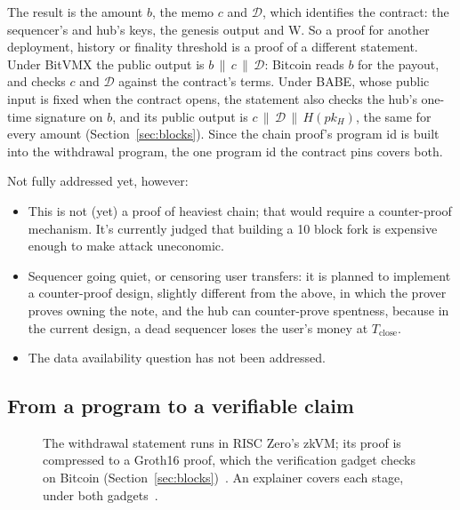 \documentclass[11pt]{article}
\newcommand{\Tc}{T_{\mathrm{close}}}
\begin{document}
The result is the amount $b$, the memo $c$ and $\mathcal{D}$, which identifies the contract: the sequencer's and hub's keys, the genesis output and W. So a proof for another deployment, history or finality threshold is a proof of a different statement. Under BitVMX the public output is $b \,\|\, c \,\|\, \mathcal{D}$: Bitcoin reads $b$ for the payout, and checks $c$ and $\mathcal{D}$ against the contract's terms. Under BABE, whose public input is fixed when the contract opens, the statement also checks the hub's one-time signature on $b$, and its public output is $c \,\|\, \mathcal{D} \,\|\, H(pk_H)$, the same for every amount (Section~\ref{sec:blocks}). Since the chain proof's program id is built into the withdrawal program, the one program id the contract pins covers both.

Not fully addressed yet, however:

\begin{itemize}
\item This is not (yet) a proof of heaviest chain; that would require a counter-proof mechanism. It's currently judged that building a 10 block fork is expensive enough to make attack uneconomic.
\item Sequencer going quiet, or censoring user transfers: it is planned to implement a counter-proof design, slightly different from the above, in which the prover proves owning the note, and the hub can counter-prove spentness, because in the current design, a dead sequencer loses the user's money at $\Tc$.
\item The data availability question has not been addressed.
\end{itemize}

\subsection{From a program to a verifiable claim}

\begin{figure}[H]
\centering
{}
\caption{The withdrawal statement runs in RISC Zero's zkVM; its proof is
compressed to a Groth16 proof, which the verification gadget checks on
Bitcoin (Section~\ref{sec:blocks})~\cite{risc0}. An explainer covers each
stage, under both gadgets~\cite{pipeline}.}
\end{figure}
\end{document}

